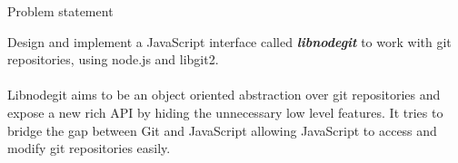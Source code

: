\begin{center}
  {\huge Problem statement} \\[1.4cm]
\end{center}

{}

Design and implement a JavaScript interface called \textit{\textbf{libnodegit}}
to work with git repositories, using node.js and libgit2. \\ \\

Libnodegit aims to be an object oriented abstraction over git repositories and
expose a new rich API by hiding the unnecessary low level features. It tries to
bridge the gap between Git and JavaScript allowing JavaScript to access and
modify git repositories easily.
